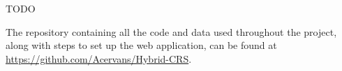 TODO

The repository containing all the code and data used throughout the project, along with steps to set up the web application, can be found at \url{https://github.com/Acervans/Hybrid-CRS}.